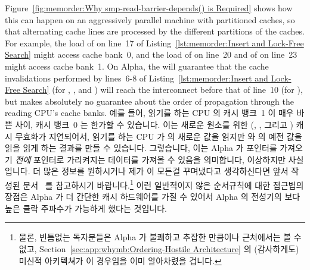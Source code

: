 Figure~\ref{fig:memorder:Why smp-read-barrier-depends() is Required}
shows how this can happen on
an aggressively parallel machine with partitioned caches, so that
alternating cache lines are processed by the different partitions
of the caches.
For example, the load of  on line~17 of
Listing~\ref{lst:memorder:Insert and Lock-Free Search}
might access cache bank~0,
and the load of  on line~20 and of  on line~23
might access cache bank~1.
On Alpha, the  will guarantee that the cache invalidations
performed by lines~6-8 of
Listing~\ref{lst:memorder:Insert and Lock-Free Search}
(for , , and ) will reach
the interconnect before that of line~10 (for ), but
makes absolutely no guarantee about the order of
propagation through the reading CPU's cache banks.
\fi
예를 들어, 읽기를 하는 CPU 의 캐시 뱅크~1 이 매우 바쁜 사이, 캐시 뱅크~0 는
한가할 수 있습니다.
이는 새로운 원소를 위한 (, , 그리고 ) 캐시
무효화가 지연되어서, 읽기를 하는 CPU 가  의 새로운 값을 읽지만
 와  의 예전 값을 읽을 읽게 하는 결과를 만들 수
있습니다.
그렇습니다, 이는 Alpha 가 포인터를 가져오기 {\em 전에} 포인터로 가리켜지는
데이터를 가져올 수 있음을 의미합니다, 이상하지만 사실입니다.
더 많은 정보를 원하시거나 제가 이 모든걸 꾸며냈다고 생각하신다면 앞서 작성된
문서~\cite{Compaq01,WilliamPugh2000Gharachorloo} 를 참고하시기
바랍니다.\footnote{
	물론, 빈틈없는 독자분들은 Alpha 가 불쾌하고 추잡한 만큼이나 근처에서는
	볼 수 없고, Section~\ref{sec:app:whymb:Ordering-Hostile Architecture}
	의 (감사하게도) 미신적 아키텍쳐가 이 경우임을 이미 알아차렸을 겁니다.}
이런 일반적이지 않은 순서규칙에 대한 접근법의 장점은 Alpha 가 더 간단한 캐시
하드웨어를 가질 수 있어서 Alpha 의 전성기의 보다 높은 클락 주파수가 가능하게
했다는 것입니다.

